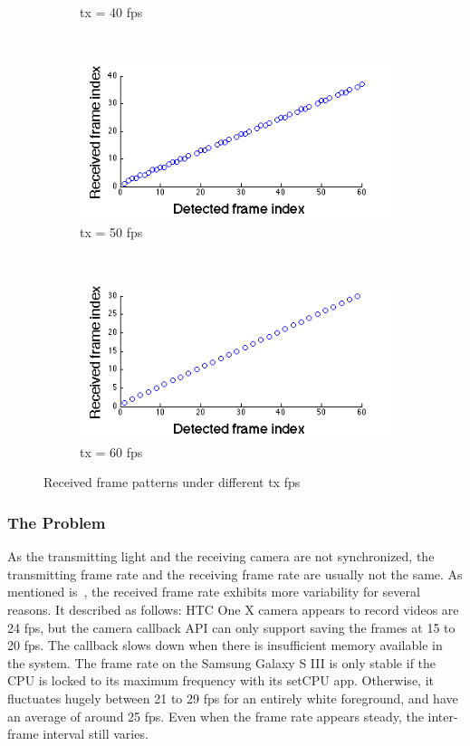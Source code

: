 \begin{figure}[!t]
\begin{subfigure}[h]{0.25\textwidth}
      \caption{tx = 40 fps} \label{fig:tx_40fps}
   \end{subfigure}%
   ~
   \begin{subfigure}[h]{0.25\textwidth}
      \includegraphics[width=\textwidth]{fig/tx_50.png}
      \caption{tx = 50 fps} \label{fig:tx_50fps}
   \end{subfigure}%
   ~
   \begin{subfigure}[h]{0.25\textwidth}
      \includegraphics[width=\textwidth]{fig/tx_60.png}
      \caption{tx = 60 fps} \label{fig:tx_60fps}
   \end{subfigure}%
   \caption{Received frame patterns under different tx fps}
   \label{fig:diff_tx}
\end{figure}

\subsubsection{The Problem}

As the transmitting light and the receiving camera are not synchronized, the transmitting frame rate and the receiving frame rate are usually not the same. 
As mentioned is~\cite{hu2013lightsync}, the received frame rate exhibits more variability for several reasons. It described as follows: HTC One X camera appears to record videos are 24 fps, but the camera callback API can only support saving the frames at 15 to 20 fps. The callback slows down when there is insufficient memory available in the system. The frame rate on the Samsung Galaxy S III is only stable if the CPU is locked to its maximum frequency with its setCPU app. Otherwise, it fluctuates hugely between 21 to 29 fps for an entirely white foreground, and have an average of around 25 fps. Even when the frame rate appears steady, the inter-frame interval still varies. 

